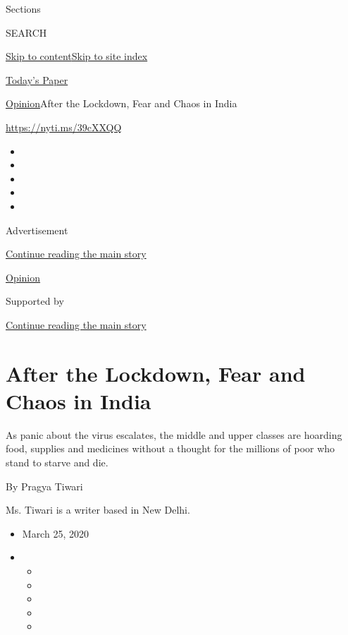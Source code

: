 Sections

SEARCH

\protect\hyperlink{site-content}{Skip to
content}\protect\hyperlink{site-index}{Skip to site index}

\href{https://myaccount.nytimes.com/auth/login?response_type=cookie\&client_id=vi}{}

\href{https://www.nytimes.com/section/todayspaper}{Today's Paper}

\href{/section/opinion}{Opinion}\textbar{}After the Lockdown, Fear and
Chaos in India

\url{https://nyti.ms/39cXXQQ}

\begin{itemize}
\item
\item
\item
\item
\item
\end{itemize}

Advertisement

\protect\hyperlink{after-top}{Continue reading the main story}

\href{/section/opinion}{Opinion}

Supported by

\protect\hyperlink{after-sponsor}{Continue reading the main story}

\hypertarget{after-the-lockdown-fear-and-chaos-in-india}{%
\section{After the Lockdown, Fear and Chaos in
India}\label{after-the-lockdown-fear-and-chaos-in-india}}

As panic about the virus escalates, the middle and upper classes are
hoarding food, supplies and medicines without a thought for the millions
of poor who stand to starve and die.

By Pragya Tiwari

Ms. Tiwari is a writer based in New Delhi.

\begin{itemize}
\item
  March 25, 2020
\item
  \begin{itemize}
  \item
  \item
  \item
  \item
  \item
  \end{itemize}
\end{itemize}

